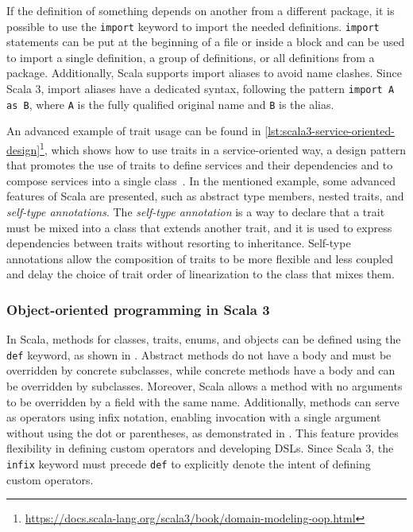 If the definition of something depends on another from a different package, it is possible to use the \texttt{import} keyword to import the needed definitions.
%
\texttt{import} statements can be put at the beginning of a file or inside a block and can be used to import a single definition, a group of definitions, or all definitions from a package.
%
Additionally, Scala supports import aliases to avoid name clashes.
%
Since Scala 3, import aliases have a dedicated syntax, following the pattern \texttt{import A as B}, where \texttt{A} is the fully qualified original name and \texttt{B} is the alias.

An advanced example of trait usage can be found in \cref{lst:scala3-service-oriented-design}\footnote{\url{https://docs.scala-lang.org/scala3/book/domain-modeling-oop.html}}, which shows how to use traits in a service-oriented way, a design pattern that promotes the use of traits to define services and their dependencies and to compose services into a single class~\cite{service-oriented-design}.
%
In the mentioned example, some advanced features of Scala are presented, such as abstract type members, nested traits, and \textit{self-type annotations}.
%
The \textit{self-type annotation} is a way to declare that a trait must be mixed into a class that extends another trait, and it is used to express dependencies between traits without resorting to inheritance.
%
Self-type annotations allow the composition of traits to be more flexible and less coupled and delay the choice of trait order of linearization to the class that mixes them.



\subsubsection{Object-oriented programming in Scala 3}

In Scala, methods for classes, traits, enums, and objects can be defined using the \texttt{def} keyword, as shown in .
%
Abstract methods do not have a body and must be overridden by concrete subclasses, while concrete methods have a body and can be overridden by subclasses.
%
Moreover, Scala allows a method with no arguments to be overridden by a field with the same name.
%
Additionally, methods can serve as operators using infix notation, enabling invocation with a single argument without using the dot or parentheses, as demonstrated in .
%
This feature provides flexibility in defining custom operators and developing \ac{DSL}s.
%
Since Scala 3, the \texttt{infix} keyword must precede \texttt{def} to explicitly denote the intent of defining custom operators.

